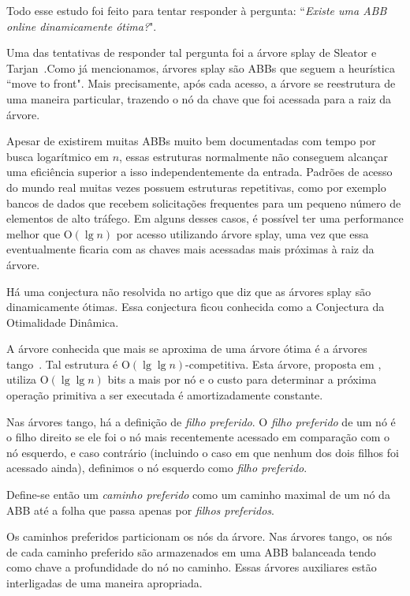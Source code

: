 Todo esse estudo foi feito para tentar responder à pergunta: ``\textit{Existe uma ABB online dinamicamente ótima?}".

Uma das tentativas de responder tal pergunta foi a árvore splay de Sleator e Tarjan~\cite{selfadjustingbst}.Como já mencionamos, árvores splay são ABBs que seguem a heurística ``move to front". Mais precisamente, após cada acesso, a árvore se reestrutura de uma maneira particular, trazendo o nó da chave que foi acessada para a raiz da árvore.

Apesar de existirem muitas ABBs muito bem documentadas com tempo por busca logarítmico em $n$, essas estruturas normalmente não conseguem alcançar uma eficiência superior a isso independentemente da entrada. Padrões de acesso do mundo real muitas vezes possuem estruturas repetitivas, como por exemplo bancos de dados que recebem solicitações frequentes para um pequeno número de elementos de alto tráfego. Em alguns desses casos, é possível ter uma performance melhor que O$(\lg n)$ por acesso utilizando árvore splay, uma vez que essa eventualmente ficaria com as chaves mais acessadas mais próximas à raiz da árvore. 

Há uma conjectura não resolvida no artigo \cite{selfadjustingbst} que diz que as árvores splay são dinamicamente ótimas. Essa conjectura ficou conhecida como a Conjectura da Otimalidade Dinâmica.

A árvore conhecida que mais se aproxima de uma árvore ótima é a árvores tango~\cite{dynamicoptimality}. Tal estrutura é O$(\lg \lg n)$-competitiva. Esta árvore, proposta em \cite{dynamicoptimality}, utiliza O$(\lg \lg n)$ bits a mais por nó e o custo para determinar a próxima operação primitiva a ser executada é amortizadamente constante.

Nas árvores tango, há a definição de \textit{filho preferido}. O \textit{filho preferido} de um nó é o filho direito se ele foi o nó mais recentemente acessado em comparação com o nó esquerdo, e caso contrário (incluindo o caso em que nenhum dos dois filhos foi acessado ainda), definimos o nó esquerdo como \textit{filho preferido}.

Define-se então um \textit{caminho preferido} como um caminho maximal de um nó da ABB até a folha que passa apenas por \textit{filhos preferidos}. 

Os caminhos preferidos particionam os nós da árvore. Nas árvores tango, os nós de cada caminho preferido são armazenados em uma ABB balanceada tendo como chave a profundidade do nó no caminho. Essas árvores auxiliares estão interligadas de uma maneira apropriada.

